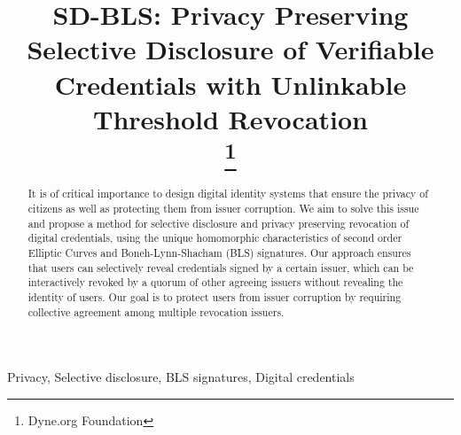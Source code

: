 \documentclass[conference]{IEEEtran}
\begin{document}
\title{SD-BLS: Privacy Preserving Selective Disclosure of Verifiable Credentials with Unlinkable Threshold Revocation\\
\thanks{Dyne.org Foundation}
}

\author{
\and
{}
\and
{}
\and
{}
}

\maketitle

\begin{abstract}
It is of critical importance to design digital identity systems that ensure the privacy of citizens as well as protecting them from issuer corruption. We aim to solve this issue and propose a method for selective disclosure and privacy preserving revocation of digital credentials, using the unique homomorphic characteristics of second order Elliptic Curves and Boneh-Lynn-Shacham (BLS) signatures. Our approach ensures that users can selectively reveal credentials signed by a certain issuer, which can be interactively revoked by a quorum of other agreeing issuers without revealing the identity of users. Our goal is to protect users from issuer corruption by requiring collective agreement among multiple revocation issuers.
\end{abstract}

\begin{IEEEkeywords}
Privacy, Selective disclosure, BLS signatures, Digital credentials
\end{IEEEkeywords}
\end{document}
